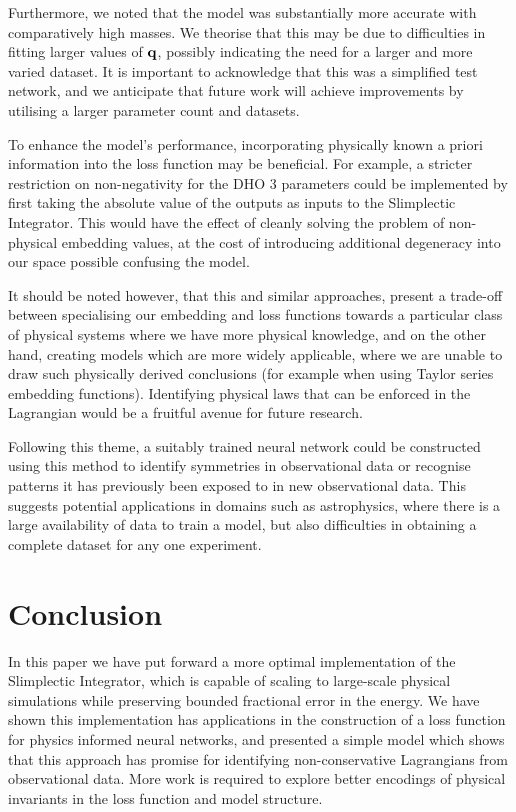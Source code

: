 Furthermore, we noted that the model was substantially more accurate with comparatively high masses. We theorise that this may be due to difficulties in fitting larger values of $\vb{q}$, possibly indicating the need for a larger and more varied dataset. It is important to acknowledge that this was a simplified test network, and we anticipate that future work will achieve improvements by utilising a larger parameter count and datasets.

To enhance the model's performance, incorporating physically known a priori information into the loss function may be beneficial. For example, a stricter restriction on non-negativity for the DHO 3 parameters could be implemented by first taking the absolute value of the outputs as inputs to the Slimplectic Integrator. This would have the effect of cleanly solving the problem of non-physical embedding values, at the cost of introducing additional degeneracy into our space possible confusing the model.

It should be noted however, that this and similar approaches, present a trade-off between specialising our embedding and loss functions towards a particular class of physical systems where we have more physical knowledge, and on the other hand, creating models which are more widely applicable, where we are unable to draw such physically derived conclusions (for example when using Taylor series embedding functions).
Identifying physical laws that can be enforced in the Lagrangian would be a fruitful avenue for future research.

Following this theme, a suitably trained neural network could be constructed using this method to identify symmetries in observational data or recognise patterns it has previously been exposed to in new observational data. This suggests potential applications in domains such as astrophysics, where there is a large availability of data to train a model, but also difficulties in obtaining a complete dataset for any one experiment.

\section{Conclusion}

In this paper we have put forward a more optimal implementation of the Slimplectic Integrator, which is capable of scaling to large-scale physical simulations while preserving bounded fractional error in the energy. We have shown this implementation has applications in the construction of a loss function for physics informed neural networks, and presented a simple model which shows that this approach has promise for identifying non-conservative Lagrangians from observational data. More work is required to explore better encodings of physical invariants in the loss function and model structure.
